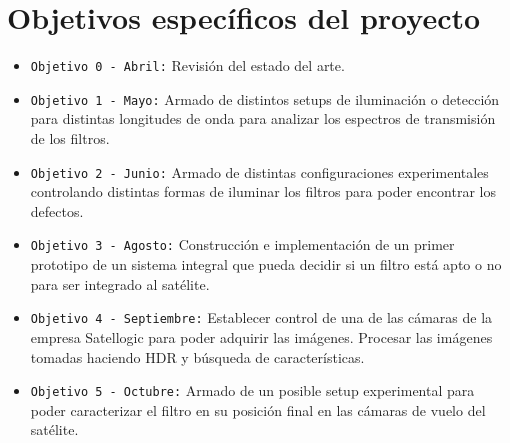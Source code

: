 \documentclass{ctuthesis}
\begin{document}
\section*{Objetivos específicos del proyecto}
\begin{itemize}
	
	\item \texttt{Objetivo 0 - Abril:} Revisión del estado del arte.
	\item \texttt{Objetivo 1 - Mayo:} Armado de distintos setups de iluminación 
	o detección para distintas longitudes de onda para analizar los espectros 
	de transmisión de los filtros.
	\item \texttt{Objetivo 2 - Junio:} Armado de distintas configuraciones 
	experimentales controlando distintas formas de iluminar los filtros
	para poder encontrar los defectos.
	\item \texttt{Objetivo 3 - Agosto:} Construcción e implementación de un primer prototipo de un sistema integral que pueda decidir si un filtro está apto o no para ser integrado al satélite.
	\item \texttt{Objetivo 4 - Septiembre:} Establecer control de una de las cámaras de la empresa Satellogic para poder adquirir las
	imágenes. Procesar las imágenes tomadas haciendo HDR y búsqueda de características.
	\item \texttt{Objetivo 5 - Octubre:} Armado de un posible setup 
	experimental para poder caracterizar el filtro en su posición final
	en las cámaras de vuelo del satélite.
\end{itemize}
\end{document}
